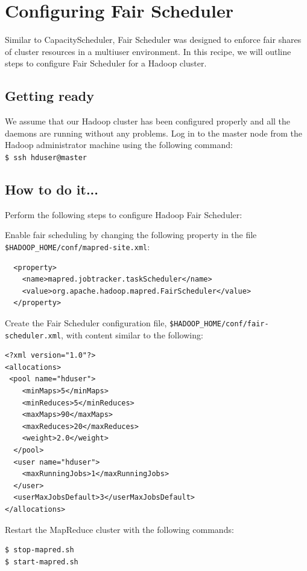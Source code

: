 \section{Configuring Fair Scheduler}
Similar to CapacityScheduler, Fair Scheduler was designed to enforce fair shares of cluster resources in a multiuser environment. In this recipe, we will outline steps to configure Fair Scheduler for a Hadoop cluster.

\subsection*{Getting ready}
We assume that our Hadoop cluster has been configured properly and all the daemons are running without any problems.
Log in to the master node from the Hadoop administrator machine using the following command: \\
\verb|$ ssh hduser@master|

\subsection*{How to do it...}
Perform the following steps to configure Hadoop Fair Scheduler: 

Enable fair scheduling by changing the following property in the file \verb|$HADOOP_HOME/conf/mapred-site.xml|:
\begin{verbatim}
  <property>
    <name>mapred.jobtracker.taskScheduler</name>
    <value>org.apache.hadoop.mapred.FairScheduler</value>
  </property>
\end{verbatim}

Create the Fair Scheduler configuration file, \verb|$HADOOP_HOME/conf/fair-scheduler.xml|, with content similar to the following: 
\lstset{style=bashstyle}
\begin{lstlisting}
<?xml version="1.0"?> 
<allocations>
 <pool name="hduser">
    <minMaps>5</minMaps>
    <minReduces>5</minReduces>
    <maxMaps>90</maxMaps>
    <maxReduces>20</maxReduces>
    <weight>2.0</weight>
  </pool>
  <user name="hduser">
    <maxRunningJobs>1</maxRunningJobs>
  </user>
  <userMaxJobsDefault>3</userMaxJobsDefault>
</allocations>
\end{lstlisting}

Restart the MapReduce cluster with the following commands:
\lstset{style=bashstyle}
\begin{lstlisting}
$ stop-mapred.sh
$ start-mapred.sh
\end{lstlisting}


